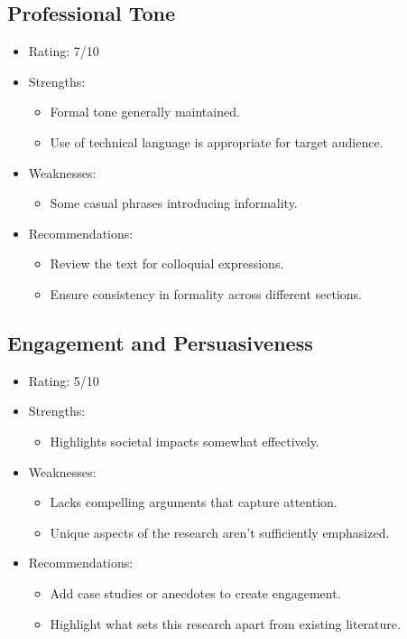 \documentclass[11pt]{article}
\begin{document}
\subsection{Professional Tone}
\begin{itemize}
    \item Rating: 7/10
    \item Strengths:
        \begin{itemize}
            \item Formal tone generally maintained.
            \item Use of technical language is appropriate for target audience.
        \end{itemize}
    \item Weaknesses:
        \begin{itemize}
            \item Some casual phrases introducing informality.
        \end{itemize}
    \item Recommendations:
        \begin{itemize}
            \item Review the text for colloquial expressions.
            \item Ensure consistency in formality across different sections.
        \end{itemize}
\end{itemize}

\subsection{Engagement and Persuasiveness}
\begin{itemize}
    \item Rating: 5/10
    \item Strengths:
        \begin{itemize}
            \item Highlights societal impacts somewhat effectively.
        \end{itemize}
    \item Weaknesses:
        \begin{itemize}
            \item Lacks compelling arguments that capture attention.
            \item Unique aspects of the research aren't sufficiently emphasized.
        \end{itemize}
    \item Recommendations:
        \begin{itemize}
            \item Add case studies or anecdotes to create engagement.
            \item Highlight what sets this research apart from existing literature.
        \end{itemize}
\end{itemize}
\end{document}
